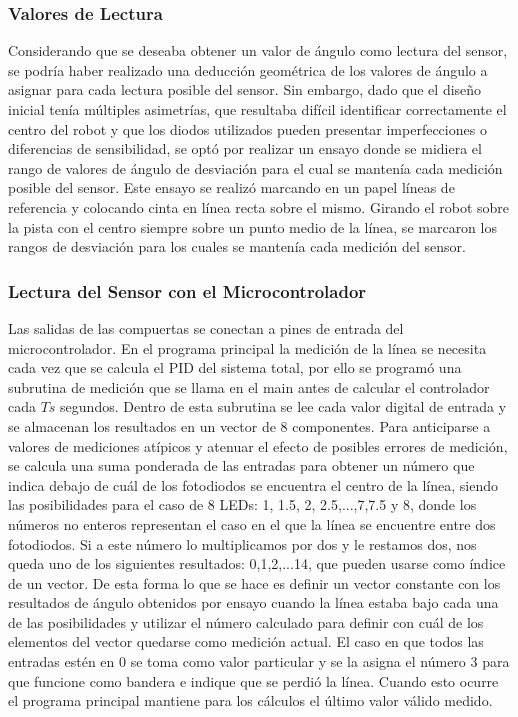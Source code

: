 \documentclass[10pt,conference,a4paper,onecolumn]{article}%
\begin{document}
\subsubsection{Valores de Lectura}
Considerando que se deseaba obtener un valor de ángulo como lectura del sensor, se podría haber realizado una deducción geométrica de los valores de ángulo a asignar para cada lectura posible del sensor. Sin embargo, dado que el diseño inicial tenía múltiples asimetrías, que resultaba difícil identificar correctamente el centro del robot y que los diodos utilizados pueden presentar imperfecciones o diferencias de sensibilidad, se optó por realizar un ensayo donde se midiera el rango de valores de ángulo de desviación para el cual se mantenía cada medición posible del sensor. Este ensayo se realizó marcando en un papel líneas de referencia y colocando cinta en línea recta sobre el mismo. Girando el robot sobre la pista con el centro siempre sobre un punto medio de la línea, se marcaron los rangos de desviación para los cuales se mantenía cada medición del sensor.
\subsubsection{Lectura del Sensor con el Microcontrolador}
Las salidas de las compuertas se conectan a pines de entrada del microcontrolador. En el programa principal la medición de la línea se necesita cada vez que se calcula el PID del sistema total, por ello se programó una subrutina de medición que se llama en el main antes de calcular el controlador cada $Ts$ segundos. Dentro de esta subrutina se lee cada valor digital de entrada y se almacenan los resultados en un vector de 8 componentes. Para anticiparse a valores de mediciones atípicos y atenuar el efecto de posibles errores de medición, se calcula una suma ponderada de las entradas para obtener un número que indica debajo de cuál de los fotodiodos se encuentra el centro de la línea, siendo las posibilidades para el caso de 8 LEDs: 1, 1.5, 2, 2.5,...,7,7.5 y 8, donde los números no enteros representan el caso en el que la línea se encuentre entre dos fotodiodos. Si a este número lo multiplicamos por dos y le restamos dos, nos queda uno de los siguientes resultados: 0,1,2,...14, que pueden usarse como índice de un vector. De esta forma lo que se hace es definir un vector constante con los resultados de ángulo obtenidos por ensayo cuando la línea estaba bajo cada una de las posibilidades y utilizar el número calculado para definir con cuál de los elementos del vector quedarse como medición actual. El caso en que todos
las entradas estén en 0 se toma como valor particular y se la asigna el número 3 para que funcione como bandera e indique que se perdió la línea. Cuando esto ocurre el programa principal mantiene para los cálculos el último valor válido medido.
\end{document}

